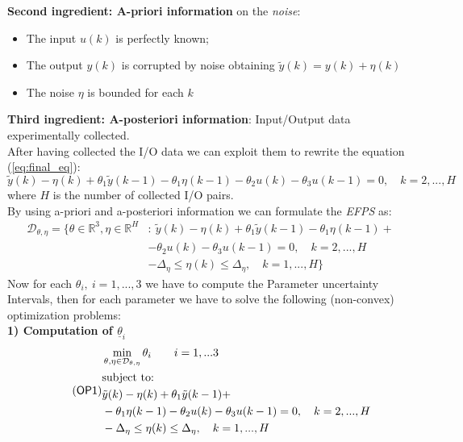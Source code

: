 \noindent 
\textbf{Second ingredient: A-priori information} on the \textit{noise}:
\begin{itemize}
    \itemsep0em
    \item The input $u(k)$ is perfectly known;
    \item The output $y(k)$ is corrupted by noise obtaining $\tilde{y}(k) = y(k) + \eta(k)$
    \item The noise $\eta$ is bounded for each $k$
\end{itemize}

\noindent
\textbf{Third ingredient: A-posteriori information}: Input/Output data experimentally collected.\\
After having collected the I/O data we can exploit them to rewrite the equation (\ref{eq:final_eq}):
\begin{equation*}
    \tilde{y}(k)-\eta(k) + \theta_1 \tilde{y}(k-1) - \theta_1 \eta(k-1)  - \theta_2 u(k) - \theta_3 u(k-1)=0, \quad k=2,...,H
\end{equation*}
where $H$ is the number of collected I/O pairs.\\

\noindent
By using a-priori and a-posteriori information we can formulate the \textit{EFPS} as:
{\large{
    \begin{align*}
        \mathcal{D}_{\theta, \eta} = \{
            \theta \in \mathbb{R}^3, \eta \in \mathbb{R}^H &: \ \tilde{y}(k)-\eta(k) + \theta_1 \tilde{y}(k-1) - \theta_1 \eta(k-1) + \\
            &- \theta_2 u(k) - \theta_3 u(k-1)=0, \quad k=2,...,H\\
            &-\Delta_\eta \le \eta(k) \le  \Delta_\eta, \quad k=1,...,H
        \}
    \end{align*}
}}
Now for each $\theta_i, \ i=1,...,3$ we have to compute the Parameter uncertainty Intervals, then for each parameter we have to solve the following (non-convex) optimization problems:\\
\textbf{1) Computation of $\underline{\theta}_i$}
\begin{equation*}  \label{eq:P1} \tag{\textsf{OP1}}
    \begin{aligned}
        &\min_{\theta, \eta \in \mathcal{D}_{\theta, \eta}} \theta_i \qquad i=1,...3\\
    & \text{subject to:}  \\
    &  \tilde{y}(k)-\eta(k) + \theta_1 \tilde{y}(k-1)+ \\
    &- \theta_1 \eta(k-1)  - \theta_2 u(k) - \theta_3 u(k-1)=0, \quad k=2,...,H\\
    &-\Delta_\eta \le \eta(k) \le  \Delta_\eta, \quad k=1,...,H
    \end{aligned}
\end{equation*}

